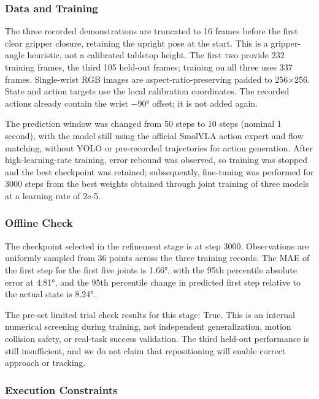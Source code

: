 \subsubsection{Data and Training}\label{s07-detail-10}

The three recorded demonstrations are truncated to 16 frames before the first clear gripper closure, retaining the upright pose at the start. This is a gripper-angle heuristic, not a calibrated tabletop height. The first two provide 232 training frames, the third 105 held-out frames; training on all three uses 337 frames. Single-wrist RGB images are aspect-ratio-preserving padded to 256\(\times\)256. State and action targets use the local calibration coordinates. The recorded actions already contain the wrist −90° offset; it is not added again.

The prediction window was changed from 50 steps to 10 steps (nominal 1 second), with the model still using the official SmolVLA action expert and flow matching, without YOLO or pre-recorded trajectories for action generation. After high-learning-rate training, error rebound was observed, so training was stopped and the best checkpoint was retained; subsequently, fine-tuning was performed for 3000 steps from the best weights obtained through joint training of three models at a learning rate of 2e-5.


\subsubsection{Offline Check}\label{s07-detail-11}

The checkpoint selected in the refinement stage is at step 3000. Observations are uniformly sampled from 36 points across the three training records. The MAE of the first step for the first five joints is 1.66°, with the 95th percentile absolute error at 4.81°, and the 95th percentile change in predicted first step relative to the actual state is 8.24°.

The pre-set limited trial check results for this stage: True. This is an internal numerical screening during training, not independent generalization, motion collision safety, or real-task success validation. The third held-out performance is still insufficient, and we do not claim that repositioning will enable correct approach or tracking.

\subsubsection{Execution Constraints}\label{s07-detail-12}

